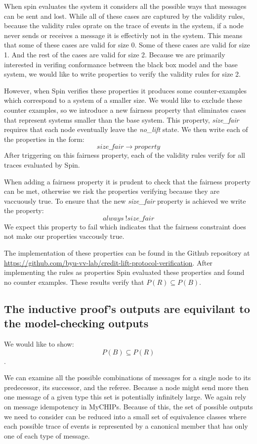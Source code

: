 \documentclass[runningheads]{llncs}
\newcommand{\coderepository}{Github repository at \url{https://github.com/byu-vv-lab/credit-lift-protocol-verification}}
\begin{document}
When spin evaluates the system it considers all the possible ways that messages can be sent and lost. While all of these cases are captured by the validity rules, because the validity rules oprate on the trace of events in the system, if a node never sends or receives a message it is effectivly not in the system. This means that some of these cases are valid for size 0. Some of these cases are valid for size 1. And the rest of the cases are valid for size 2. Because we are primarily interested in verifing conformance between the black box model and the base system, we would like to write properties to verify the validity rules for size 2. 

However, when Spin verifies these properties it produces some counter-examples which correspond to a system of a smaller size. We would like to exclude these counter examples, so we introduce a new fairness property that eliminates cases that represent systems smaller than the base system. This property, \emph{size\_fair} requires that each node eventually leave the \emph{no\_lift} state. We then write each of the properties in the form:
$$size\_fair \longrightarrow property$$
After triggering on this fairness property, each of the validity rules verify for all traces evaluated by Spin. 

When adding a fairness property it is prudent to check that the fairness property can be met, otherwise we risk the properties verifying because they are vaccuously true. To ensure that the new \emph{size\_fair} property is achieved we write the property:
$$always\ !size\_fair$$
We expect this property to fail which indicates that the fairness constraint does not make our properties vaccously true. 

The implementation of these properties can be found in the \coderepository. After implementing the rules as properties Spin evaluated these properties and found no counter examples. These results verify that 
$P(R) \subseteq P(B)$. 

\subsection{The inductive proof's outputs are equivilant to the model-checking outputs}
\label{sec:outputs_bigger}
We would like to show:
$$P(B) \subseteq P(R)$$. 

We can examine all the possible combinations of messages for a single node to its predecessor, its successor, and the referee. Because a node might send more then one message of a given type this set is potentially infinitely large. We again rely on message idempotency in MyCHIPs. Because of this, the set of possible outputs we need to consider can be reduced into a small set of equivalence classes where each possible trace of events is represented by a canonical member that has only one of each type of message.
\end{document}
